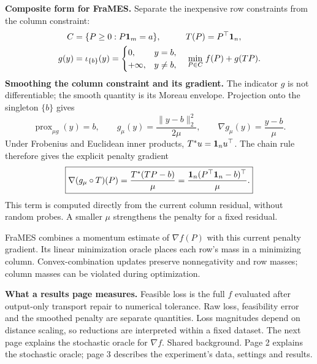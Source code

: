 \textbf{Composite form for FraMES.}
Separate the inexpensive row constraints from the column constraint:
\[
 \begin{aligned}
 C&=\{P\geq0:P\mathbf{1}_m=a\}, & T(P)&=P^\top\mathbf{1}_n,\\
 g(y)&=\iota_{\{b\}}(y)
 =\begin{cases}0,&y=b,\\+\infty,&y\ne b,\end{cases}
 &\min_{P\in C}\;&f(P)+g(TP).
 \end{aligned}
\]
\textbf{Smoothing the column constraint and its gradient.}
The indicator $g$ is not differentiable; the smooth quantity is its Moreau
envelope. Projection onto the singleton $\{b\}$ gives
\[
 \operatorname{prox}_{\mu g}(y)=b,\qquad
 g_\mu(y)=\frac{\|y-b\|_2^2}{2\mu},\qquad
 \nabla g_\mu(y)=\frac{y-b}{\mu}.
\]
Under Frobenius and Euclidean inner products, $T^*u=\mathbf{1}_nu^\top$.
The chain rule therefore gives the explicit penalty gradient
\[
 \boxed{\nabla(g_\mu\circ T)(P)
 =\frac{T^*(TP-b)}{\mu}
 =\frac{\mathbf{1}_n(P^\top\mathbf{1}_n-b)^\top}{\mu}.}
\]
This term is computed directly from the current column residual, without random
probes. A smaller $\mu$ strengthens the penalty for a fixed residual.

FraMES combines a momentum estimate of $\nabla f(P)$ with this current penalty
gradient. Its linear minimization oracle places each row's mass in a minimizing
column. Convex-combination updates preserve nonnegativity and row masses;
column masses can be violated during optimization.

\textbf{What a results page measures.}
Feasible loss is the full $f$ evaluated after output-only transport repair to
numerical tolerance. Raw loss, feasibility error and the smoothed penalty are
separate quantities. Loss magnitudes depend on distance scaling, so reductions
are interpreted within a fixed dataset. The next page explains the stochastic
oracle for $\nabla f$.
\vfill
{\footnotesize\color{muted}Shared background. Page 2 explains the stochastic oracle; page 3 describes the experiment's data, settings and results.}
